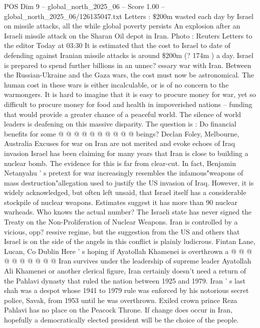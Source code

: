 \begin{textsample}{POS Dim 9 – global\_north\_2025\_06 – Score 1.00 – global\_north\_2025\_06/126135047.txt}  \label{ex:f9_pos_371}
Letters : \$200m wasted each day by Israel on missile attacks, all the while global poverty persists An explosion after an Israeli missile attack on the Sharan Oil depot in Iran.
Photo : Reuters Letters to the editor Today at 03:30 It is estimated that the cost to Israel to date of defending against Iranian missile attacks is around \$200m (? 174m ) a day.
Israel is prepared to spend further billions in an unnec? essary war with Iran.
Between the Russian-Ukraine and the Gaza wars, the cost must now be astronomical.
The human cost in these wars is either incalculable, or is of no concern to the warmongers.
It is hard to imagine that it is easy to procure money for war, yet so difficult to procure money for food and health in impoverished nations -- funding that would provide a greater chance of a peaceful world.
The silence of world leaders is deafening on this massive disparity.
The question is : Do financial benefits for some @ @ @ @ @ @ @ @ @ @ beings?
Declan Foley, Melbourne, Australia Excuses for war on Iran are not merited and evoke echoes of Iraq invasion Israel has been claiming for many years that Iran is close to building a nuclear bomb.
The evidence for this is far from clear-cut.
In fact, Benjamin Netanyahu ' s pretext for war increasingly resembles the infamous"weapons of mass destruction"allegation used to justify the US invasion of Iraq.
However, it is widely acknowledged, but often left unsaid, that Israel itself has a considerable stockpile of nuclear weapons.
Estimates suggest it has more than 90 nuclear warheads.
Who knows the actual number?
The Israeli state has never signed the Treaty on the Non-Proliferation of Nuclear Weapons.
Iran is controlled by a vicious, opp? ressive regime, but the suggestion from the US and others that Israel is on the side of the angels in this conflict is plainly ludicrous.
Fintan Lane, Lucan, Co Dublin Here ' s hoping if Ayatollah Khamenei is overthrown a @ @ @ @ @ @ @ @ @ @ Iran survives under the leadership of supreme leader Ayatollah Ali Khamenei or another clerical figure, Iran certainly doesn't need a return of the Pahlavi dynasty that ruled the nation between 1925 and 1979.
Iran ' s last shah was a despot whose 1941 to 1979 rule was enforced by his notorious secret police, Savak, from 1953 until he was overthrown.
Exiled crown prince Reza Pahlavi has no place on the Peacock Throne.
If change does occur in Iran, hopefully a democratically elected president will be the choice of the people.

\end{textsample}
